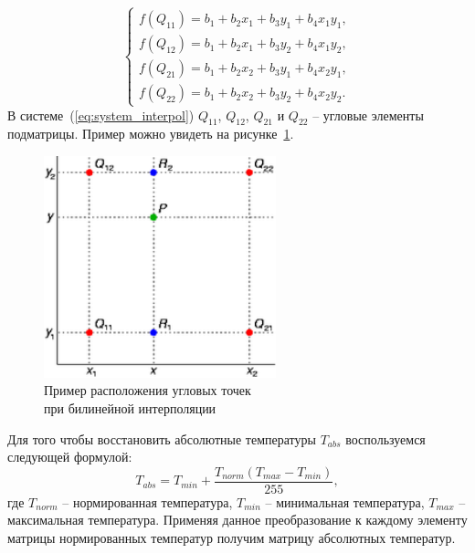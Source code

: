 \documentclass[14pt, a4paper]{extreport}
\begin{document}
	\begin{equation}
	\begin{cases}
		f(Q_{11})=b_{1}+b_{2} x_{1}+b_{3} y_{1}+b_{4} x_{1} y_{1}, \\
		f(Q_{12})=b_{1}+b_{2} x_{1}+b_{3} y_{2}+b_{4} x_{1} y_{2}, \\
		f(Q_{21})=b_{1}+b_{2} x_{2}+b_{3} y_{1}+b_{4} x_{2} y_{1}, \\
		f(Q_{22})=b_{1}+b_{2} x_{2}+b_{3} y_{2}+b_{4} x_{2} y_{2}.
	\end{cases}
	\label{eq:system_interpol}
	\end{equation}
	В системе~(\ref{eq:system_interpol}) $Q_{11}$, $Q_{12}$, $Q_{21}$ и $Q_{22}$ -- угловые элементы подматрицы. Пример можно увидеть на рисунке~\ref{fig:Bilinear_interpolation}.
	\begin{figure}[h!]
		\centering
		\includegraphics[width = 0.6\textwidth]{image/chapter_2/Bilinear_interpolation}	
		\caption{Пример расположения угловых точек \\при билинейной интерполяции}
		\label{fig:Bilinear_interpolation}
	\end{figure}
	Для того чтобы восстановить абсолютные температуры $T_{abs}$ воспользуемся следующей формулой:
	\begin{equation*}
		T_{abs} = T_{min} + \frac{T_{norm}(T_{max} - T_{min})}{255},
		\label{eq:T_abs}
	\end{equation*}
	где $T_{norm}$ -- нормированная температура, $T_{min}$ -- минимальная температура, $T_{max}$ -- максимальная температура. Применяя данное преобразование к каждому элементу матрицы нормированных температур получим матрицу абсолютных температур.
	
\end{document}

